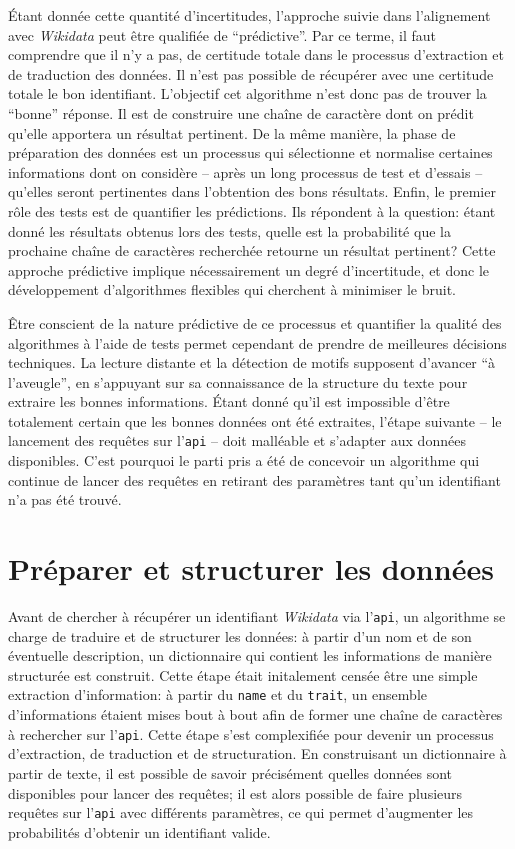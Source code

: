 \documentclass[a4paper, 12pt, twoside]{book}
\newcommand{\api}{\texttt{\gls{api}}}
\newcommand{\tname}{\texttt{name}}
\newcommand{\ttrait}{\texttt{trait}}
\newcommand{\wkd}{\textit{Wikidata}}
\begin{document}
Étant donnée cette quantité d'incertitudes, l'approche suivie dans l'alignement avec \wkd{} peut être qualifiée de \enquote{prédictive}. Par ce terme, il faut comprendre que il n'y a pas, de certitude totale dans le processus d'extraction et de traduction des données. Il n'est pas possible de récupérer avec une certitude totale le bon identifiant. L'objectif cet algorithme n'est donc pas de trouver la \enquote{bonne} réponse. Il est de construire une chaîne de caractère dont on prédit qu'elle apportera un résultat pertinent. De la même manière, la phase de préparation des données est un processus qui sélectionne et normalise certaines informations dont on considère -- après un long processus de test et d'essais -- qu'elles seront pertinentes dans l'obtention des bons résultats. Enfin, le premier rôle des tests est de quantifier les prédictions. Ils répondent à la question: étant donné les résultats obtenus lors des tests, quelle est la probabilité que la prochaine chaîne de caractères recherchée retourne un résultat pertinent? Cette approche prédictive implique nécessairement un degré d'incertitude, et donc le développement d'algorithmes flexibles qui cherchent à minimiser le bruit. 

Être conscient de la nature prédictive de ce processus et quantifier la qualité des algorithmes à l'aide de tests permet cependant de prendre de meilleures décisions techniques. La lecture distante et la détection de motifs supposent d'avancer \enquote{à l'aveugle}, en s'appuyant sur sa connaissance de la structure du texte pour extraire les bonnes informations. Étant donné qu'il est impossible d'être totalement certain que les bonnes données ont été extraites, l'étape suivante -- le lancement des requêtes sur l'\api{} -- doit malléable et s'adapter aux données disponibles. C'est pourquoi le parti pris a été de concevoir un algorithme qui continue de lancer des requêtes en retirant des paramètres tant qu'un identifiant n'a pas été trouvé.

\section{Préparer et structurer les données}
Avant de chercher à récupérer un identifiant \wkd{} via l'\api{}, un algorithme se charge de traduire et de structurer les données: à partir d'un nom et de son éventuelle description, un dictionnaire qui contient les informations de manière structurée est construit. Cette étape était initalement censée être une simple extraction d'information: à partir du \tname{} et du \ttrait{}, un ensemble d'informations étaient mises bout à bout afin de former une chaîne de caractères à rechercher sur l'\api{}. Cette étape s'est complexifiée pour devenir un processus d'extraction, de traduction et de structuration. En construisant un \gls{dictionnaire} à partir de texte, il est possible de savoir précisément quelles données sont disponibles pour lancer des requêtes; il est alors possible de faire plusieurs requêtes sur l'\api{} avec différents paramètres, ce qui permet d'augmenter les probabilités d'obtenir un identifiant valide. 
\end{document}
